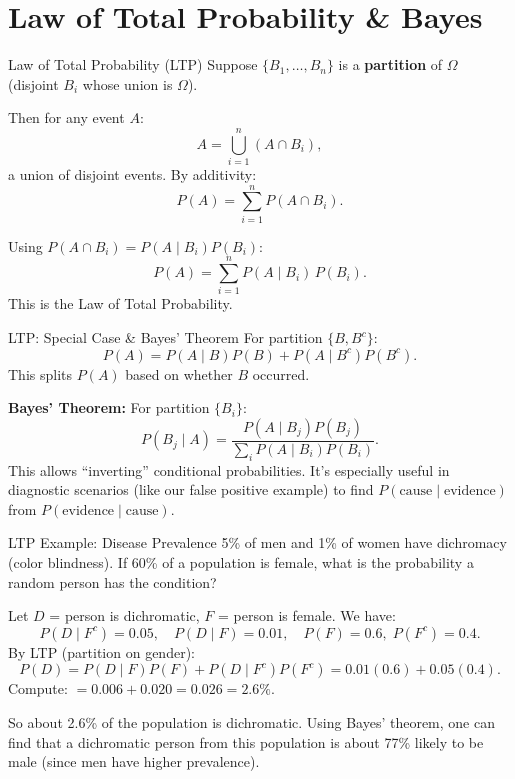 \documentclass[aspectratio=169,11pt]{beamer} %
\begin{document}
\section{Law of Total Probability \& Bayes}

\begin{frame}{Law of Total Probability (LTP)}
Suppose $\{B_1, \dots, B_n\}$ is a \textbf{partition} of $\Omega$ (disjoint $B_i$ whose union is $\Omega$).

Then for any event $A$:
\[ A = \bigcup_{i=1}^n (A \cap B_i), \]
a union of disjoint events. By additivity:
\[ P(A) = \sum_{i=1}^n P(A \cap B_i).\]

Using $P(A \cap B_i) = P(A \mid B_i) P(B_i)$:
\[ \boxed{P(A) = \sum_{i=1}^n P(A \mid B_i)\, P(B_i).} \]
This is the Law of Total Probability.
\end{frame}

\begin{frame}{LTP: Special Case \& Bayes' Theorem}
For partition $\{B, B^c\}$:
\[P(A) = P(A \mid B)P(B) + P(A \mid B^c)P(B^c).\]
This splits $P(A)$ based on whether $B$ occurred. \newline

\textbf{Bayes' Theorem:} For partition $\{B_i\}$:
\[ P(B_j \mid A) = \frac{P(A \mid B_j) P(B_j)}{\sum_{i} P(A \mid B_i)P(B_i)}.\]
This allows “inverting” conditional probabilities. It's especially useful in diagnostic scenarios (like our false positive example) to find $P(\text{cause} \mid \text{evidence})$ from $P(\text{evidence} \mid \text{cause})$.
\end{frame}

\begin{frame}{LTP Example: Disease Prevalence}
5\% of men and 1\% of women have dichromacy (color blindness). If 60\% of a population is female, what is the probability a random person has the condition? \newline

Let $D$ = person is dichromatic, $F$ = person is female. We have:
\[
P(D \mid F^c) = 0.05, \quad 
P(D \mid F) = 0.01, \quad
P(F) = 0.6, \; P(F^c)=0.4.
\]
By LTP (partition on gender):
\[
P(D) = P(D \mid F)P(F) + P(D \mid F^c)P(F^c) = 0.01(0.6) + 0.05(0.4).
\]
Compute: $= 0.006 + 0.020 = 0.026 = 2.6\%.$ \newline

So about 2.6\% of the population is dichromatic. Using Bayes' theorem, one can find that a dichromatic person from this population is about 77\% likely to be male (since men have higher prevalence).
\end{frame}
\end{document}
